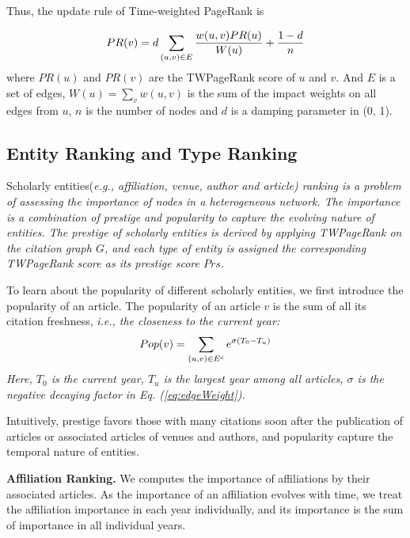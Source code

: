 {\par
Thus, the update rule of Time-weighted PageRank is

\begin{equation}
\centering
\label{eq:twPR}
PR(v)= d \sum_{(u,v)\in E} \frac{w(u,v)PR(u)}{W(u)} + \frac{1-d}{n}
\end{equation}
where $PR(u)$ and $PR(v)$ are the TWPageRank score of $u$ and $v$. And $E$ is a set of edges, $W(u)=\sum_v w(u,v)$ is the sum of the impact weights on all edges from $u$, $n$ is the number of nodes and $d$ is a damping parameter in (0, 1).


\subsection{Entity Ranking and Type Ranking}
\par
Scholarly entities(\itshape e.g., \upshape affiliation, venue, author and article) ranking is a problem of assessing the importance of nodes in a heterogeneous network. The importance is a combination of \itshape prestige \upshape and \itshape popularity \upshape to capture the evolving nature of entities. The prestige of scholarly entities is derived by applying TWPageRank on the citation graph $G$, and each type of entity is assigned the corresponding TWPageRank score as its prestige score $Prs$.

\par
To learn about the popularity of different scholarly entities, we first introduce the popularity of an article. The popularity of an article $v$ is the sum of all its citation freshness, \itshape i.e., \upshape the closeness to the current year:
\begin{equation}
\centering
\label{eq:pop}
Pop (v) = \sum_{(u,v) \in E^c} e^{\sigma(T_0 - T_u)}
\end{equation}
Here, $T_0$ is the current year, $T_u$ is the largest year among all articles, $\sigma$ is the negative decaying factor in Eq. (\ref{eq:edgeWeight}).

\par
Intuitively, prestige favors those with many citations soon after the publication of articles or associated articles of venues and authors, and popularity capture the temporal nature of entities.


\textbf{Affiliation Ranking.} We computes the importance of affiliations by their associated articles. As the importance of an affiliation evolves with time, we treat the affiliation importance in each year individually, and its importance is the sum of importance in all individual years.

}
